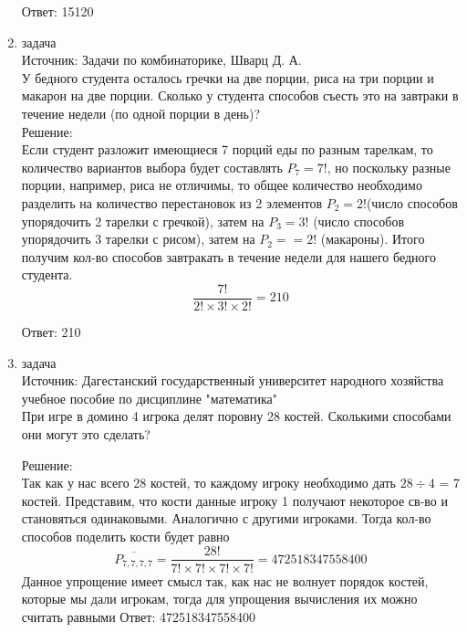 \documentclass[a4paper,14pt]{extreport} %
\begin{document}
\begin{center}
\begin{enumerate}
						Ответ: 15120
						
						
						
						\item {\large задача  }\\
						Источник: Задачи по комбинаторике, Шварц Д. А.\\
						\vspace{15pt}
						У бедного студента осталось гречки на две порции, риса на три порции и макарон на две порции. Сколько у студента способов съесть это на завтраки в течение недели (по одной порции в день)?\\
						\vspace{15pt}
						Решение:\\
						Если студент разложит имеющиеся 7 порций еды по разным тарелкам, то количество вариантов выбора будет составлять $P_7 = 7!$, но поскольку разные порции, например, риса не отличимы, то общее количество необходимо разделить на количество перестановок из 2 элементов $P_2 = 2!$(число способов упорядочить 2 тарелки с гречкой), затем на $P_3 = 3!$ (число способов упорядочить 3 тарелки с рисом), затем на $P_2 = =2!$ (макароны). Итого получим кол-во способов завтракать в течение недели для нашего бедного студента.
						\begin{equation}
							 \frac{7!}{2!\times3!\times2!} = 210
						\end{equation}
						
						Ответ: 210
						
						
						
						 \item {\large задача }\\
						Источник: Дагестанский государственный университет народного хозяйства учебное пособие по дисциплине "математика"  \\
						\vspace{15pt}
						При игре в домино 4 игрока делят поровну 28 костей.
						Сколькими способами они могут это сделать?\\
						\vspace{15pt}
						
						Решение:\\
							Так как у нас всего 28 костей, то каждому игроку необходимо дать $28 \div 4 $ = 7 костей.
							Представим, что кости данные игроку 1 получают некоторое св-во и становяться одинаковыми. Аналогично с другими игроками.
							Тогда кол-во способов поделить кости будет равно
						\begin{equation}
							\overline{P_{7,7,7,7}}=\frac{28!}{7!\times7!\times7!\times7!} = 472518347558400
						\end{equation}
						Данное упрощение имеет смысл так, как нас не волнует порядок костей, которые мы дали игрокам, тогда для упрощения вычисления их можно считать равными
						Ответ: 472518347558400
						

\end{enumerate}
\end{center}
\end{document}
